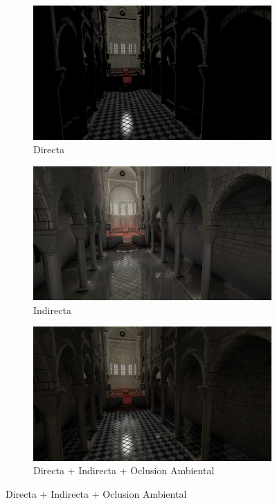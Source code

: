 \begin{figure}[H]
	\centering
	\begin{subfigure}[t]{.49\linewidth}
		\centering
		\captionsetup{justification=centering}
		\caption*{Directa}
		\includegraphics[width=\linewidth]{media/finals/sibenik_direct.png}
	\end{subfigure}%
	\hspace{0.01\textwidth}
	\begin{subfigure}[t]{.49\linewidth}
		\centering
		\caption*{Indirecta}
		\captionsetup{justification=centering}
		\includegraphics[width=\linewidth]{media/finals/sibenik_indirect.png}
	\end{subfigure}%
	\par\bigskip
	\begin{subfigure}[t]{.49\linewidth}
		\centering
		\caption*{Directa + Indirecta + Oclusion Ambiental}
		\captionsetup{justification=centering}
		\includegraphics[width=\linewidth]{media/finals/sibenik_gi.png}

\end{subfigure}
\end{figure}
